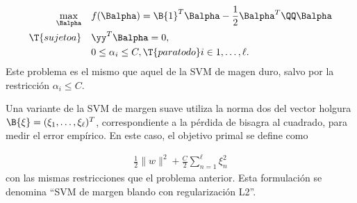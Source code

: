 \begin{align}
\begin{split}\label{svmprob-dual-soft}
    \max_{\Balpha} \quad
    & f(\Balpha) = \B{1}^T\Balpha-\frac{1}{2}\Balpha^T\QQ\Balpha\\
    \T{sujeto a}\quad & \yy^T\Balpha = 0, \\
                      & 0\leq\alpha_i\leq C, \T{ para todo } i\in {1,\ldots,\ell }.
\end{split}\end{align}
Este problema es el mismo que aquel de la SVM de magen duro, salvo por la restricción
$\alpha_i\leq C$.

Una variante de la SVM de margen suave utiliza la norma dos del
vector holgura $\B{\xi}=(\xi_1,\ldots,\xi_\ell)^T$, correspondiente
a la pérdida de bisagra al cuadrado, para medir el error empírico.
En este caso, el objetivo primal se define como

\begin{align}
  \label{svm-l2}
  \frac{1}{2}\|w\|^2+\frac{C}{2}\sum_{n=1}^{\ell}\xi_n^2
\end{align}
con las mismas restricciones que el problema anterior.
Esta formulación se denomina ``SVM de margen blando con regularización L2''.
